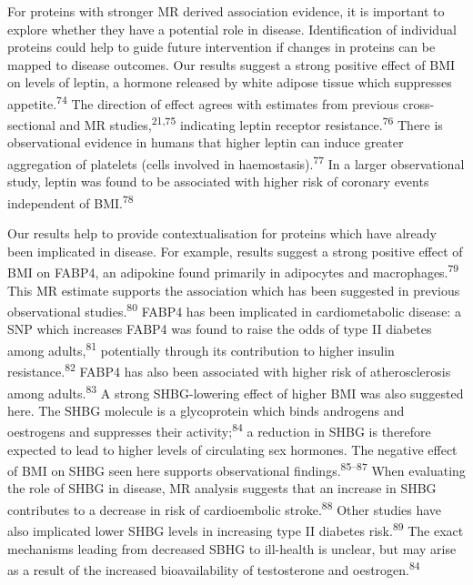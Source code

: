 \documentclass[11pt,twoside]{bristolthesis}
\begin{document}
For proteins with stronger MR derived association evidence, it is important to explore whether they have a potential role in disease. Identification of individual proteins could help to guide future intervention if changes in proteins can be mapped to disease outcomes. Our results suggest a strong positive effect of BMI on levels of leptin, a hormone released by white adipose tissue which suppresses appetite.\textsuperscript{74} The direction of effect agrees with estimates from previous cross-sectional and MR studies,\textsuperscript{21,75} indicating leptin receptor resistance.\textsuperscript{76} There is observational evidence in humans that higher leptin can induce greater aggregation of platelets (cells involved in haemostasis).\textsuperscript{77} In a larger observational study, leptin was found to be associated with higher risk of coronary events independent of BMI.\textsuperscript{78}

Our results help to provide contextualisation for proteins which have already been implicated in disease. For example, results suggest a strong positive effect of BMI on FABP4, an adipokine found primarily in adipocytes and macrophages.\textsuperscript{79} This MR estimate supports the association which has been suggested in previous observational studies.\textsuperscript{80} FABP4 has been implicated in cardiometabolic disease: a SNP which increases FABP4 was found to raise the odds of type II diabetes among adults,\textsuperscript{81} potentially through its contribution to higher insulin resistance.\textsuperscript{82} FABP4 has also been associated with higher risk of atherosclerosis among adults.\textsuperscript{83} A strong SHBG-lowering effect of higher BMI was also suggested here. The SHBG molecule is a glycoprotein which binds androgens and oestrogens and suppresses their activity;\textsuperscript{84} a reduction in SHBG is therefore expected to lead to higher levels of circulating sex hormones. The negative effect of BMI on SHBG seen here supports observational findings.\textsuperscript{85--87} When evaluating the role of SHBG in disease, MR analysis suggests that an increase in SHBG contributes to a decrease in risk of cardioembolic stroke.\textsuperscript{88} Other studies have also implicated lower SHBG levels in increasing type II diabetes risk.\textsuperscript{89} The exact mechanisms leading from decreased SBHG to ill-health is unclear, but may arise as a result of the increased bioavailability of testosterone and oestrogen.\textsuperscript{84}
\end{document}
